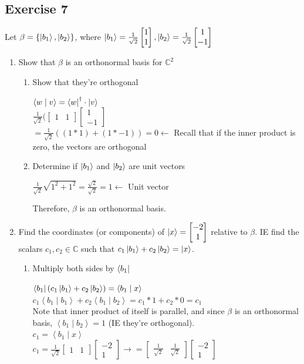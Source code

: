 \documentclass[12pt]{article}
\theoremstyle{plain}
\theoremstyle{nonumberplain}
\theoremstyle{plain}
\theoremstyle{nonumberplain}
\newcommand\1{{\bf 1}}
\newcommand{\bmat}[1]{\begin{bmatrix*} #1 \end{bmatrix*}} %
\newcommand{\C}{\mathbb{C}} %
\newcommand{\<}{\left\langle}
\renewcommand{\>}{\right\rangle}
\newcommand{\inp}[2]{\left\langle#1\mid #2\right\rangle} %
\begin{document}
\subsection{Exercise 7}
Let $\beta=\lbrace\ket{b_1},\ket{b_2}\rbrace$, where $\ket{b_1}=\frac{1}{\sqrt{2}}\bmat{1 \\ 1}, \ket{b_2}=\frac{1}{\sqrt{2}}\bmat{1 \\ -1}$
\begin{enumerate}[label=(\alph*)]
	\item Show that $\beta$ is an orthonormal basis for $\C^2$ \\
	\begin{enumerate}[label=(\roman*)]
		\item Show that they're orthogonal
		\begin{center}
		$\inp{w}{v}=\bra{w}^\dagger\cdot\ket{v}$ \\
		$\frac{1}{\sqrt{2}}(\bmat{1 & 1}\bmat{1 \\ -1}$ \\
		$=\frac{1}{\sqrt{2}}((1*1)+(1*-1))=0\longleftarrow$ Recall that if the inner product is zero, the vectors are orthogonal
		\end{center}
		\item Determine if $\ket{b_1}$ and $\ket{b_2}$ are unit vectors
		\begin{center}
		\indent $\frac{1}{\sqrt{2}}\sqrt{1^2+1^2}=\frac{\sqrt{2}}{\sqrt{2}}=1\longleftarrow$ Unit vector
		\end{center}
		Therefore, $\beta$ is an orthonormal basis.
	\end{enumerate}
	\item Find the coordinates (or components) of $\ket{x}=\bmat{-2 \\ 1}$ relative to $\beta$. IE find the scalars $c_1, c_2 \in \C$ such that $c_1\ket{b_1}+c_2\ket{b_2}=\ket{x}$.
	\begin{enumerate}[label=(\roman*)]
		\item Multiply both sides by $\bra{b_1}$
		\begin{center}
		$\bra{b_1}(c_1\ket{b_1}+c_2\ket{b_2})=\inp{b_1}{x}$ \\
		$c_1\inp{b_1}{b_1}+c_2\inp{b_1}{b_2} = c_1*1+c_2*0=c_1$ \\ 
		Note that inner product of itself is parallel, and since $\beta$ is an orthonormal basis, $\inp{b_1}{b_2}=1$ (IE they're orthogonal). \\
		$c_1=\inp{b_1}{x}$ \\
		$c_1=\frac{1}{\sqrt{2}}\bmat{1 & 1}\bmat{-2 \\ 1}\longrightarrow =\bmat{\frac{1}{\sqrt{2}} & \frac{1}{\sqrt{2}}}\bmat{-2 \\ 1}$ \\

\end{center}
\end{enumerate}
\end{enumerate}
\end{document}
